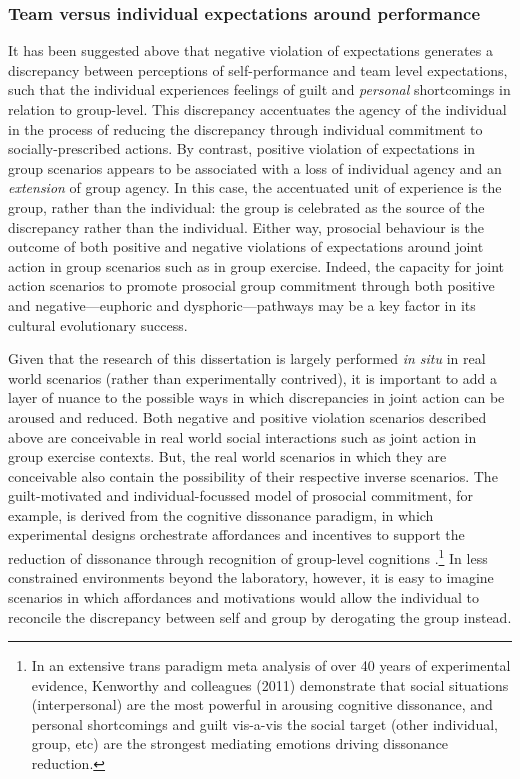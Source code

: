 \begin{mccorrection}
\subsubsection{Team versus individual expectations around performance}
It has been suggested above that negative violation of expectations generates a discrepancy between perceptions of self-performance and team level expectations, such that the individual experiences feelings of guilt and \textit{personal} shortcomings in relation to group-level.   This discrepancy accentuates the agency of the individual in the process of reducing the discrepancy through individual commitment to socially-prescribed actions.  By contrast, positive violation of expectations in group scenarios appears to be associated with a loss of individual agency and an \textit{extension} of group agency.  In this case, the accentuated unit of experience is the group, rather than the individual: the group is celebrated as the source of the discrepancy rather than the individual.  Either way, prosocial behaviour is the outcome of both positive and negative violations of expectations around joint action in group scenarios such as in group exercise.  Indeed, the capacity for joint action scenarios to promote prosocial group commitment through both positive and negative---euphoric and dysphoric---pathways may be a key factor in its cultural evolutionary success.

Given that the research of this dissertation is largely performed \textit{in situ} in real world scenarios (rather than experimentally contrived), it is important to add a layer of nuance to the possible ways in which discrepancies in joint action can be aroused and reduced.  Both negative and positive violation scenarios described above are conceivable in real world social interactions such as joint action in group exercise contexts. But, the real world scenarios in which they are conceivable also contain the possibility of their respective inverse scenarios.  The guilt-motivated and individual-focussed model of prosocial commitment, for example, is derived from the cognitive dissonance paradigm, in which experimental designs orchestrate affordances and incentives to support the reduction of dissonance through recognition of group-level cognitions \citep{Kenworthy2011}.\footnote{In an extensive trans paradigm meta analysis of over 40 years of experimental evidence, Kenworthy and colleagues (2011) demonstrate that social situations (interpersonal) are the most powerful in arousing cognitive dissonance, and personal shortcomings and guilt vis-a-vis the social target (other individual, group, etc) are the strongest mediating emotions driving dissonance reduction.}  In less constrained environments beyond the laboratory, however, it is easy to imagine scenarios in which affordances and motivations would allow the individual to reconcile the discrepancy between self and group by derogating the group instead.


\end{mccorrection}
